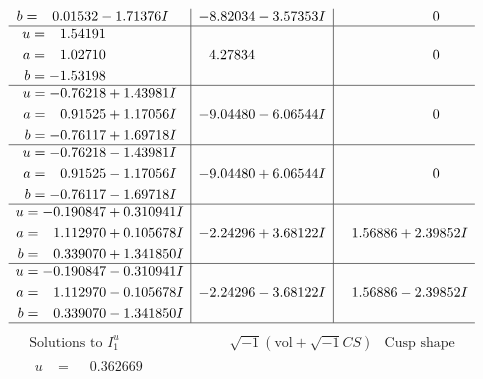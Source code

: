 \documentclass[1p]{elsarticle_modified}
\theoremstyle{definition}
\newcommand{\I}{\sqrt{-1}}
\begin{document}
$$\begin{array}{c|c|c}
\begin{aligned}
b &= \phantom{-}0.01532 - 1.71376 I\end{aligned}
 & -8.82034 - 3.57353 I & \phantom{-0.000000 } 0 \\ \hline\begin{aligned}
u &= \phantom{-}1.54191\phantom{ +0.000000I} \\
a &= \phantom{-}1.02710\phantom{ +0.000000I} \\
b &= -1.53198\phantom{ +0.000000I}\end{aligned}
 & \phantom{-}4.27834\phantom{ +0.000000I} & \phantom{-0.000000 } 0 \\ \hline\begin{aligned}
u &= -0.76218 + 1.43981 I \\
a &= \phantom{-}0.91525 + 1.17056 I \\
b &= -0.76117 + 1.69718 I\end{aligned}
 & -9.04480 - 6.06544 I & \phantom{-0.000000 } 0 \\ \hline\begin{aligned}
u &= -0.76218 - 1.43981 I \\
a &= \phantom{-}0.91525 - 1.17056 I \\
b &= -0.76117 - 1.69718 I\end{aligned}
 & -9.04480 + 6.06544 I & \phantom{-0.000000 } 0 \\ \hline\begin{aligned}
u &= -0.190847 + 0.310941 I \\
a &= \phantom{-}1.112970 + 0.105678 I \\
b &= \phantom{-}0.339070 + 1.341850 I\end{aligned}
 & -2.24296 + 3.68122 I & \phantom{-}1.56886 + 2.39852 I \\ \hline\begin{aligned}
u &= -0.190847 - 0.310941 I \\
a &= \phantom{-}1.112970 - 0.105678 I \\
b &= \phantom{-}0.339070 - 1.341850 I\end{aligned}
 & -2.24296 - 3.68122 I & \phantom{-}1.56886 - 2.39852 I\\
 \hline 
 \end{array}$$\newpage$$\begin{array}{c|c|c}  
\text{Solutions to }I^u_{1}& \I (\text{vol} + \sqrt{-1}CS) & \text{Cusp shape}\\
 \hline 
\begin{aligned}
u &= \phantom{-}0.362669\phantom{ +0.000000I} \\

\end{aligned}
\end{array}$$
\end{document}
